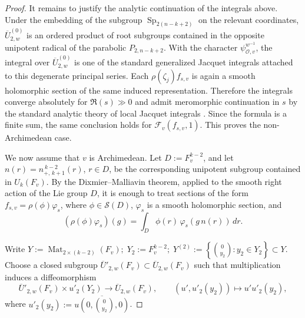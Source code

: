\documentclass[11pt,notitlepage]{amsart}
\theoremstyle{definition}
\theoremstyle{remark}
\newcommand{\calF}{\mathcal{F}}
\newcommand{\calO}{\mathcal{O}}
\newcommand{\nPlusKone}{n_{+,\,k+1}^{\,k-2}}
\DeclareMathOperator{\Sp}{Sp}
\DeclareMathOperator{\Mat}{Mat}
\begin{document}
\begin{proof}
It remains to justify the analytic continuation of the integrals above.
Under the embedding of the subgroup \(\Sp_{2(n-k+2)}\) on the relevant coordinates,
\(\overline U^{(0)}_{2,w}\) is an ordered product of root subgroups contained in the
opposite unipotent radical of the parabolic \(P_{2,n-k+2}\). With the character
\(\psi^{w^{-1}}_{\calO,v}\), the integral over
\(\overline U^{(0)}_{2,w}\) is one of the standard generalized Jacquet integrals
attached to this degenerate principal series. Each \(\rho(\zeta_j)f_{s,v}\) is again
a smooth holomorphic section of the same induced representation. Therefore the
integrals converge absolutely for \(\Re(s)\gg0\) and admit
meromorphic continuation in \(s\) by the standard analytic theory of local
Jacquet integrals \cite{J67}. Since the formula is a finite sum, the same conclusion holds
for \(\calF_v(f_{s,v},1)\). This proves the non-Archimedean case.

We now assume that \(v\) is Archimedean. Let $D:=F_v^{k-2}$, and let \(n(r)=\nPlusKone(r)\), \(r\in D\), be the corresponding unipotent subgroup
contained in \(U_k(F_v)\). By the Dixmier--Malliavin theorem, applied to the
smooth right action of the Lie group \(D\), it is enough to treat sections of the
form $f_{s,v}=\rho(\phi)\varphi_s$, where \(\phi\in \mathcal S(D)\), \(\varphi_s\) is a smooth holomorphic section, and
\[
  (\rho(\phi)\varphi_s)(g)
  =
  \int_D \phi(r)\,\varphi_s(g\,n(r))\,dr .
\]

Write
  $Y:=\Mat_{2\times(k-2)}(F_v);\;
  Y_2:=F_v^{k-2};\;
  Y^{(2)}:=\left\{\binom{0}{y_2}:y_2\in Y_2\right\}\subset Y$.
Choose a closed subgroup
\(\overline U'_{2,w}(F_v)\subset \overline U_{2,w}(F_v)\) such that multiplication
induces a diffeomorphism
\[
  \overline U'_{2,w}(F_v)\times u'_2(Y_2)
  \longrightarrow
  \overline U_{2,w}(F_v),\qquad
  (u',u'_2(y_2))\longmapsto u'u'_2(y_2),
\]
where
  $u'_2(y_2):=\overline{u\!\left(0,\binom{0}{y_2},0\right)}$.
  

\end{proof}
\end{document}
